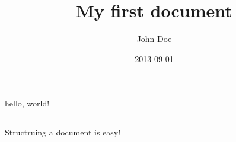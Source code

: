 \documentclass{article}
\title{My first document}
\date{2013-09-01}
\author{John Doe}
\begin{document}
  \section{}
  hello, world!
  \subsection{}
Structruing a document is easy!
  \paragraph{}
\end{document}
